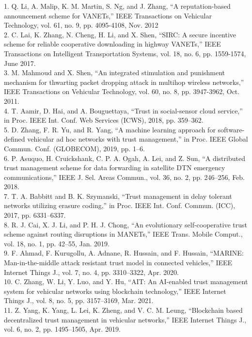 \documentclass[11pt]{IEEEphot}
\begin{document}


1.  Q. Li, A. Malip, K. M. Martin, S. Ng, and J. Zhang, “A reputation-based announcement scheme for VANETs,” IEEE Transactions on Vehicular Technology, vol. 61, no. 9, pp. 4095-4108, Nov. 2012 
\\
2. C. Lai, K. Zhang, N. Cheng, H. Li, and X. Shen, “SIRC: A secure incentive scheme for reliable cooperative downloading in highway VANETs,” IEEE Transactions on Intelligent Transportation Systems, vol. 18, no. 6, pp. 1559-1574, June 2017. 
\\
3. M. Mahmoud and X. Shen, “An integrated stimulation and punishment mechanism for thwarting packet dropping attack in multihop wireless networks,” IEEE Transactions on Vehicular Technology, vol. 60, no. 8, pp. 3947-3962, Oct. 2011. 
\\
4. T. Aamir, D. Hai, and A. Bouguettaya, “Trust in social-sensor cloud service,” in Proc. IEEE Int. Conf. Web Services (ICWS), 2018, pp. 359–362. 
\\
5. D. Zhang, F. R. Yu, and R. Yang, “A machine learning approach for software-defined vehicular ad hoc networks with trust management,” in Proc. IEEE Global Commun. Conf. (GLOBECOM), 2019, pp. 1–6.  
\\
6. P. Asuquo, H. Cruickshank, C. P. A. Ogah, A. Lei, and Z. Sun, “A distributed trust management scheme for data forwarding in satellite DTN emergency communications,” IEEE J. Sel. Areas Commun., vol. 36, no. 2, pp. 246–256, Feb. 2018. 
\\
7.  T. A. Babbitt and B. K. Szymanski, “Trust management in delay tolerant networks utilizing erasure coding,” in Proc. IEEE Int. Conf. Commun. (ICC), 2017, pp. 6331–6337. 
\\
8.  R. J. Cai, X. J. Li, and P. H. J. Chong, “An evolutionary self-cooperative trust scheme against routing disruptions in MANETs,” IEEE Trans. Mobile Comput., vol. 18, no. 1, pp. 42–55, Jan. 2019. 
\\
9.  F. Ahmad, F. Kurugollu, A. Adnane, R. Hussain, and F. Hussain, “MARINE: Man-in-the-middle attack resistant trust model in connected vehicles,” IEEE Internet Things J., vol. 7, no. 4, pp. 3310–3322, Apr. 2020. 
\\
10. C. Zhang, W. Li, Y. Luo, and Y. Hu, “AIT: An AI-enabled trust management system for vehicular networks using blockchain technology,” IEEE Internet Things J., vol. 8, no. 5, pp. 3157–3169, Mar. 2021. 
\\
11. Z. Yang, K. Yang, L. Lei, K. Zheng, and V. C. M. Leung, “Blockchain based decentralized trust management in vehicular networks,” IEEE Internet Things J., vol. 6, no. 2, pp. 1495–1505, Apr. 2019. 
\end{document}

